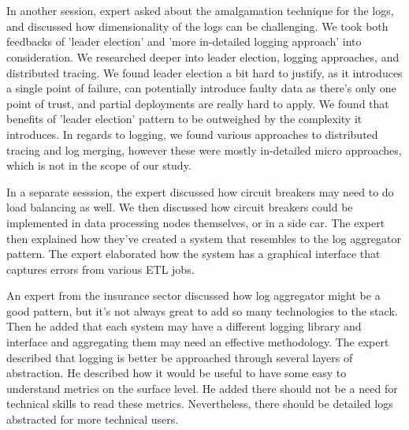 \documentclass{bmcart}
\begin{document}
\,

\setlength{\fboxsep}{0.7em}
\noindent{}

\,

In another session, expert asked about the amalgamation technique for the logs, and discussed how dimensionality of the logs can be challenging. We took both feedbacks of 'leader election' and 'more in-detailed logging approach' into consideration. We researched deeper into leader election, logging approaches, and distributed tracing. We found leader election a bit hard to justify, as it introduces a single point of failure, can potentially introduce faulty data as there's only one point of trust, and partial deployments are really hard to apply. We found that benefits of 'leader election' pattern to be outweighed by the complexity it introduces. In regards to logging, we found various approaches to distributed tracing and log merging, however these were mostly in-detailed micro approaches, which is not in the scope of our study. 

In a separate sesssion, the expert discussed how circuit breakers may need to do load balancing as well. We then discussed how circuit breakers could be implemented in data processing nodes themselves, or in a side car. The expert then explained how they've created a system that resembles to the log aggregator pattern. The expert elaborated how the system has a graphical interface that captures errors from various ETL jobs. 

An expert from the insurance sector discussed how log aggregator might be a good pattern, but it's not always great to add so many technologies to the stack. Then he added that each system may have a different logging library and interface and aggregating them may need an effective methodology. The expert described that logging is better be approached through several layers of abstraction. He described how it would be useful to have some easy to understand metrics on the surface level. He added there should not be a need for technical skills to read these metrics. Nevertheless, there should be detailed logs abstracted for more technical users.

\,

\setlength{\fboxsep}{0.7em}
\noindent{}
\end{document}
